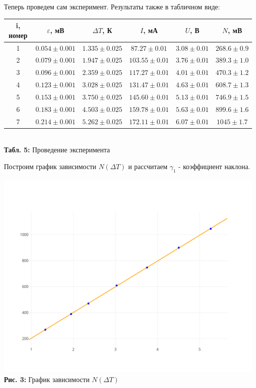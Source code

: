\documentclass[12pt,a4paper]{scrartcl}
\begin{document}
	Теперь проведем сам эксперимент. Результаты также в табличном виде:
	\begin{center}
		\begin{tabular}{|c|c|c|c|c|c|}
			\hline
			i, номер & $\varepsilon$, мВ & $\Delta T$, К & $I$, мА & $U$, В & $N$, мВ
			\\\hline
			1 & $0.054 \pm 0.001$ & $1.335 \pm 0.025$ & $87.27 \pm 0.01$ & $3.08 \pm 0.01$ & $268.6 \pm 0.9$
			\\\hline
			2 & $0.079 \pm 0.001$ & $1.947 \pm 0.025$ & $103.55 \pm 0.01$ & $3.76 \pm 0.01$ & $389.3 \pm 1.0$
			\\\hline
			3 & $0.096 \pm 0.001$ & $2.359 \pm 0.025$ & $117.27 \pm 0.01$ & $4.01 \pm 0.01$ & $470.3 \pm 1.2$
			\\\hline
			4 & $0.123 \pm 0.001$ & $3.028 \pm 0.025$ & $131.47 \pm 0.01$ & $4.63 \pm 0.01$ & $608.7 \pm 1.3$
			\\\hline
			5 & $0.153 \pm 0.001$ & $3.750 \pm 0.025$ & $145.60 \pm 0.01$ & $5.13 \pm 0.01$ & $746.9 \pm 1.5$
			\\\hline
			6 & $0.183 \pm 0.001$ & $4.503 \pm 0.025$ & $159.78 \pm 0.01$ & $5.63 \pm 0.01$ & $899.6 \pm 1.6$
			\\\hline
			7 & $0.214 \pm 0.001$ & $5.262 \pm 0.025$ & $172.11 \pm 0.01$ & $6.07 \pm 0.01$ & $1045 \pm 1.7$
			\\\hline
		\end{tabular}
		\\\textbf{Табл. 5:} Проведение эксперимента
	\end{center}
	
	Построим график зависимости $N(\Delta T)$ и рассчитаем $\gamma_1$ - коэффициент наклона.
	
	\begin{center}
		\includegraphics[scale=0.112]{PIC_3.png}
		\\\textbf{Рис. 3:} График зависимости $N(\Delta T)$
	\end{center}
	
\end{document}
